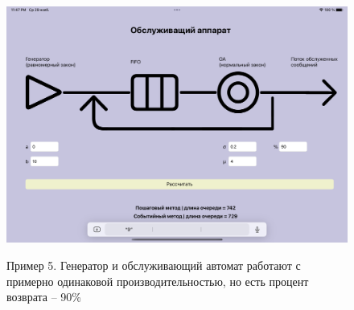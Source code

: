 \begin{figure}[h!]
	\begin{center}
		{\includegraphics[scale = 0.15]{img/ex5.png}}
		\caption{Пример 5. Генератор и обслуживающий автомат работают с примерно одинаковой производительностью, но есть процент возврата  -- 90\%}
		\label{fig5:image}
	\end{center}
\end{figure}

\newpage

